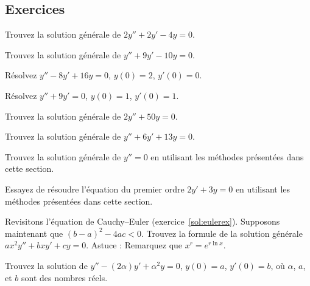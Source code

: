 \subsection{Exercices}

\begin{exercise}
Trouvez la solution générale de $2y'' + 2y' -4 y = 0$.
\end{exercise}

\begin{exercise}
Trouvez la solution générale de $y'' + 9y' - 10 y = 0$.
\end{exercise}

\begin{exercise}
Résolvez $y'' - 8y' + 16 y = 0$, $y(0) = 2$, $y'(0) = 0$.
\end{exercise}

\begin{exercise}
Résolvez $y'' + 9y' = 0$, $y(0) = 1$, $y'(0) = 1$.
\end{exercise}

\begin{exercise}
Trouvez la solution générale de $2y'' + 50y = 0$.
\end{exercise}

\begin{exercise}
Trouvez la solution générale de $y'' + 6 y' + 13 y = 0$.
\end{exercise}

\begin{exercise}
Trouvez la solution générale de $y'' = 0$ en utilisant les méthodes présentées dans cette section. 
\end{exercise}

\begin{exercise}
Essayez de résoudre l'équation du premier ordre  
$2y' + 3y = 0$ en utilisant les méthodes présentées dans cette section. 
\end{exercise}

\begin{exercise}
Revisitons l'équation de Cauchy--Euler  (exercice~\ref{sol:eulerex}).  Supposons maintenant que ${(b-a)}^2-4ac < 0$.  Trouvez la formule de la solution générale  $a x^2 y'' + b x y' + c y = 0$.  Astuce : Remarquez que $x^r = e^{r \ln x}$.
\end{exercise}

\begin{exercise}
Trouvez la solution de
$y''-(2\alpha) y' + \alpha^2 y=0$, $y(0) = a$, $y'(0)=b$,
où $\alpha$, $a$, et $b$ sont des nombres réels.
\end{exercise}

